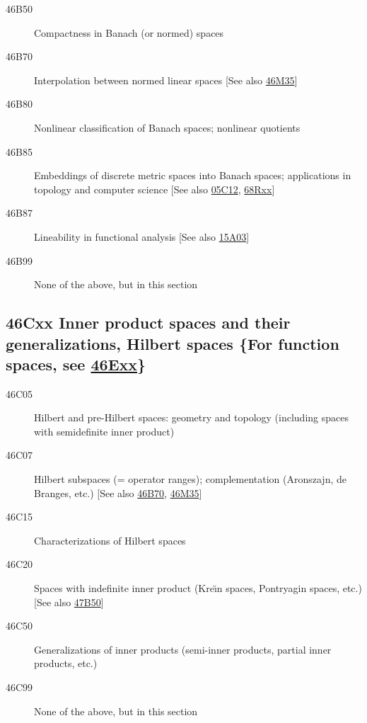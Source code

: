 \documentclass[letterpaper]{article}
\begin{document}
\begin{description}
\item [46B50]\label{46B50} Compactness in Banach (or normed) spaces
\item [46B70]\label{46B70} Interpolation between normed linear spaces [See also \hyperref[46M35]{46M35}]
\item [46B80]\label{46B80} Nonlinear classification of Banach spaces; nonlinear quotients
\item [46B85]\label{46B85} Embeddings of discrete metric spaces into Banach spaces; applications in topology and computer science [See also \hyperref[05C12]{05C12}, \hyperref[68Rxx]{68Rxx}]
\item [46B87]\label{46B87} Lineability in functional analysis [See also \hyperref[15A03]{15A03}]
\item [46B99]\label{46B99} None of the above, but in this section
\end{description}
\subsection*{46Cxx  Inner product spaces and their generalizations, Hilbert spaces \{For function spaces, see \hyperref[46Exx]{46Exx}\} }\label{46Cxx}
\begin{description}  
\item [46C05]\label{46C05} Hilbert and pre-Hilbert spaces: geometry and topology (including spaces with semidefinite inner product)
\item [46C07]\label{46C07} Hilbert subspaces (= operator ranges); complementation (Aronszajn, de Branges, etc.) [See also \hyperref[46B70]{46B70}, \hyperref[46M35]{46M35}]
\item [46C15]\label{46C15} Characterizations of Hilbert spaces
\item [46C20]\label{46C20} Spaces with indefinite inner product (Kre\u{\i}n spaces, Pontryagin spaces, etc.) [See also \hyperref[47B50]{47B50}]
\item [46C50]\label{46C50} Generalizations of inner products (semi-inner products, partial inner products, etc.)
\item [46C99]\label{46C99} None of the above, but in this section
\end{description}
\end{document}
